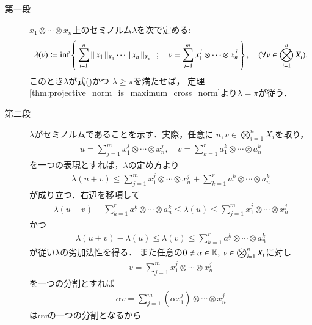 	\begin{prf}\mbox{}
		\begin{description}
			\item[第一段]
				$x_1 \otimes \cdots \otimes x_n$上のセミノルム$\lambda$を次で定める:
				\begin{align}
					\lambda(v) \coloneqq \operatorname*{inf}_{} \left\{\ \sum_{i=1}^n \left\|\, x_1\, \right\|_{X_1} \cdots \left\|\, x_n\, \right\|_{X_n}\ \, ; \quad 
					v = \sum_{j=1}^m x^j_1 \otimes \cdots \otimes x^j_n\ \right\},
					\quad (\forall v \in \bigotimes_{i=1}^n X_i).
				\end{align}
				このとき$\lambda$が式()かつ
				$\lambda \geq \pi$を満たせば，
				定理\ref{thm:projective_norm_is_maximum_cross_norm}より$\lambda = \pi$が従う．
				
			\item[第二段]
				$\lambda$がセミノルムであることを示す．実際，任意に
				$u,v \in \bigotimes_{i=1}^n X_i$を取り，
				\begin{align}
					u = \sum_{j=1}^{m} x^j_1 \otimes \cdots \otimes x^j_n,
					\quad v = \sum_{k=1}^r a^k_1 \otimes \cdots \otimes a^k_n
				\end{align}
				を一つの表現とすれば，$\lambda$の定め方より
				\begin{align}
					\lambda(u+v) \leq \sum_{j=1}^{m} x^j_1 \otimes \cdots \otimes x^j_n 
						+ \sum_{k=1}^r a^k_1 \otimes \cdots \otimes a^k_n
				\end{align}
				が成り立つ．右辺を移項して
				\begin{align}
					\lambda(u+v) - \sum_{k=1}^r a^k_1 \otimes \cdots \otimes a^k_n 
					\leq \lambda(u) 
					\leq \sum_{j=1}^{m} x^j_1 \otimes \cdots \otimes x^j_n
				\end{align}
				かつ
				\begin{align}
					\lambda(u+v) - \lambda(u) \leq \lambda(v) \leq \sum_{k=1}^r a^k_1 \otimes \cdots \otimes a^k_n 
				\end{align}
				が従い$\lambda$の劣加法性を得る．
				また任意の$0 \neq \alpha \in \mathbb{K},\ v \in \bigotimes_{i=1}^n X_i$に対し
				\begin{align}
					v = \sum_{j=1}^{m} x^j_1 \otimes \cdots \otimes x^j_n
				\end{align}
				を一つの分割とすれば
				\begin{align}
					\alpha v = \sum_{j=1}^{m} \left( \alpha x^j_1 \right) \otimes \cdots \otimes x^j_n
				\end{align}
				は$\alpha v$の一つの分割となるから
				\begin{align}

\end{align}
\end{description}
\end{prf}
